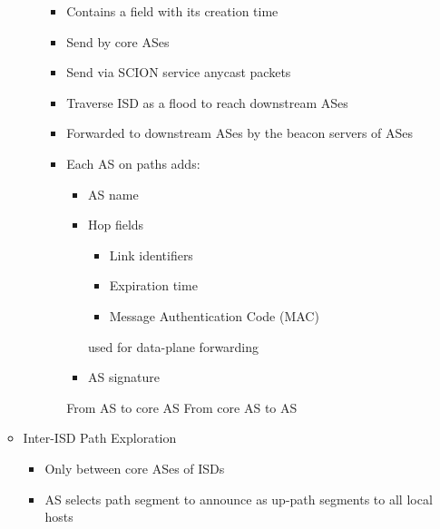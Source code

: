 \begin{itemize}
\begin{itemize}
\begin{itemize}
                        \begin{itemize}
                            \item Contains a field with its creation time
                            \item Send by core ASes
                            \item Send via SCION service anycast packets
                            \item Traverse ISD as a flood to reach downstream ASes
                            \item Forwarded to downstream ASes by the beacon servers of ASes
                            \item Each AS on paths adds:
                                \begin{itemize}
                                    \item AS name
                                    \item Hop fields
                                        \begin{itemize}
                                            \item Link identifiers
                                            \item Expiration time
                                            \item Message Authentication Code (MAC)
                                        \end{itemize}
                                        used for data-plane forwarding
                                    \item AS signature
                                \end{itemize}
                                 From AS to core AS
                                 From core AS to AS
                        \end{itemize}
                \end{itemize}
            \item Inter-ISD Path Exploration
                \begin{itemize}
                    \item Only between core ASes of ISDs
                \end{itemize}
                \begin{itemize}
                    \item AS selects path segment to announce as up-path segments to all local hosts

\end{itemize}
\end{itemize}
\end{itemize}
